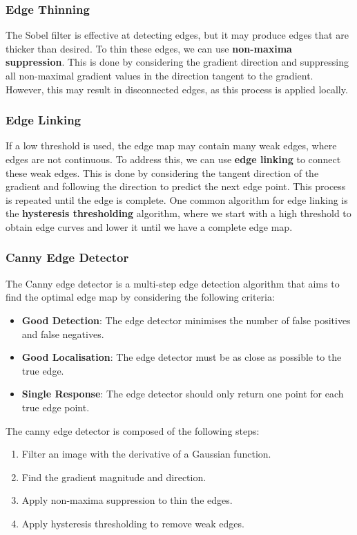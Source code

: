 \documentclass{article}
\begin{document}
\subsubsection{Edge Thinning}
The Sobel filter is effective at detecting edges, but it may produce
edges that are thicker than desired. To thin these edges, we can use
\textbf{non-maxima suppression}. This is done by considering the
gradient direction and suppressing all non-maximal gradient values in
the direction tangent to the gradient. However, this may result in
disconnected edges, as this process is applied locally.
\subsubsection{Edge Linking}
If a low threshold is used, the edge map may contain many weak edges,
where edges are not continuous. To address this, we can use
\textbf{edge linking} to connect these weak edges. This is done by
considering the tangent direction of the gradient and following the
direction to predict the next edge point. This process is repeated
until the edge is complete. One common algorithm for edge linking is
the \textbf{hysteresis thresholding} algorithm, where we start with a
high threshold to obtain edge curves and lower it until we have a
complete edge map.
\subsubsection{Canny Edge Detector}
The Canny edge detector is a multi-step edge detection algorithm that
aims to find the optimal edge map by considering the following
criteria:
\begin{itemize}
    \item \textbf{Good Detection}: The edge detector minimises the
          number of false positives and false negatives.
    \item \textbf{Good Localisation}: The edge detector must be as close
          as possible to the true edge.
    \item \textbf{Single Response}: The edge detector should only
          return one point for each true edge point.
\end{itemize}
The canny edge detector is composed of the following steps:
\begin{enumerate}
    \item Filter an image with the derivative of a Gaussian function.
    \item Find the gradient magnitude and direction.
    \item Apply non-maxima suppression to thin the edges.
    \item Apply hysteresis thresholding to remove weak edges.
\end{enumerate}
\end{document}
